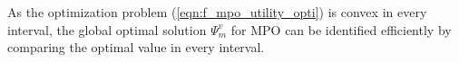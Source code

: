 \documentclass[10pt,journal, compsoc]{IEEEtran}
\begin{document}
As the optimization problem (\ref{eqn:f_mpo_utility_opti}) is convex in every interval, the global optimal solution $\Psi_m^v$ for MPO can be identified efficiently by comparing the optimal value in every interval.
\end{document}
